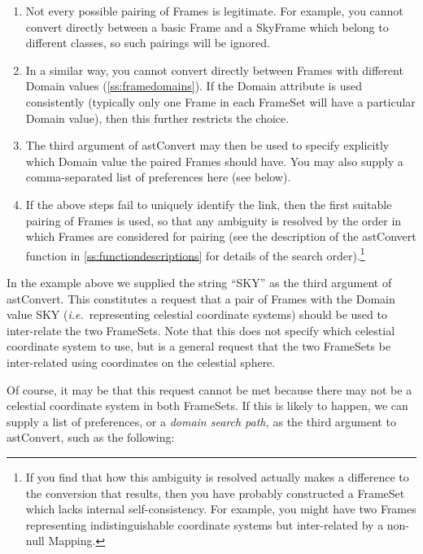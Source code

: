\documentclass[twoside,11pt]{article}
\newcommand{\htmlref}[2]{#1}
\newcommand{\appref}[1]{Appendix~\ref{#1}}
\newcommand{\secref}[1]{\S\ref{#1}}
\renewcommand{\appref}[1]{\ref{#1}}
\renewcommand{\secref}[1]{\ref{#1}}
\begin{document}
\begin{enumerate}
\item Not every possible pairing of Frames is legitimate. For example,
you cannot convert directly between a basic Frame and a \htmlref{SkyFrame}{SkyFrame} which
belong to different classes, so such pairings will be ignored.

\item In a similar way, you cannot convert directly between Frames
with different Domain values (\secref{ss:framedomains}). If the Domain
attribute is used consistently (typically only one Frame in each
FrameSet will have a particular Domain value), then this further
restricts the choice.

\item The third argument of astConvert may then be used to specify
explicitly which Domain value the paired Frames should have. You may
also supply a comma-separated list of preferences here (see below).

\item If the above steps fail to uniquely identify the link, then the
first suitable pairing of Frames is used, so that any ambiguity is
resolved by the order in which Frames are considered for pairing (see
the description of the astConvert function in
\appref{ss:functiondescriptions} for details of the search
order).\footnote{If you find that how this ambiguity is resolved
actually makes a difference to the conversion that results, then you
have probably constructed a FrameSet which lacks internal
self-consistency. For example, you might have two Frames representing
indistinguishable coordinate systems but inter-related by a non-null
\htmlref{Mapping}{Mapping}.}
\end{enumerate}

In the example above we supplied the string ``SKY'' as the third
argument of astConvert. This constitutes a request that a pair of
Frames with
the Domain value SKY ({\em{i.e.}}\ representing celestial coordinate
systems) should be used to inter-relate the two FrameSets. Note that
this does not specify which celestial coordinate system to use, but is
a general request that the two FrameSets be inter-related using
coordinates on the celestial sphere.

Of course, it may be that this request cannot be met because there may
not be a celestial coordinate system in both FrameSets. If this is
likely to happen, we can supply a list of preferences, or a
{\em{domain search path,}}
as the third argument to astConvert, such as
the following:
\end{document}
